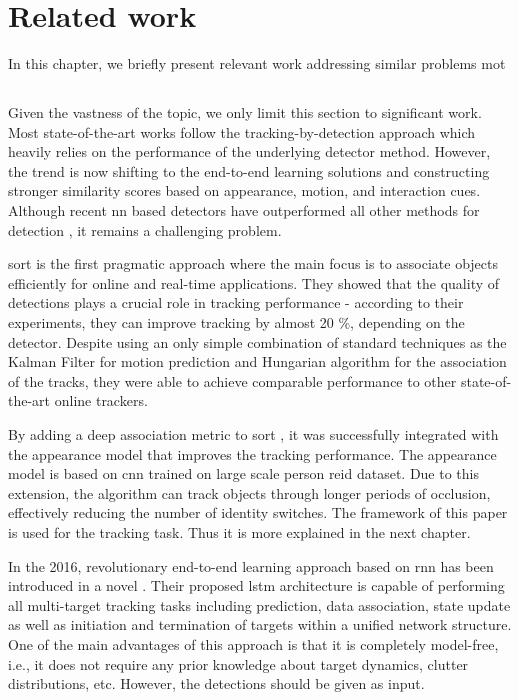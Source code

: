 \chapter{Related work}
In this chapter, we briefly present relevant work addressing similar problems \gls{mot}

\section{}
    Given the vastness of the topic, we only limit this section to significant work. Most state-of-the-art works follow the tracking-by-detection approach which heavily relies on the performance of the underlying detector method. However, the trend is now shifting to the end-to-end learning solutions and constructing stronger similarity scores based on appearance, motion, and interaction cues. Although recent \gls{nn} based detectors have outperformed all other methods for detection \cite{russakovsky2015imagenet, ren2015faster, redmon2016you}, it remains a challenging problem.
   
    \Gls{sort} \cite{bewley2016simple} is the first pragmatic approach where the main focus is to associate objects efficiently for online and real-time applications. They showed that the quality of detections plays a crucial role in tracking performance - according to their experiments, they can improve tracking by almost 20 \%, depending on the detector. Despite using an only simple combination of standard techniques as the Kalman Filter for motion prediction and Hungarian algorithm for the association of the tracks, they were able to achieve comparable performance to other state-of-the-art online trackers. 
    
    By adding a deep association metric to \gls{sort} \cite{wojke2017simple}, it was successfully integrated with the appearance model that improves the tracking performance. The appearance model is based on \gls{cnn} trained on large scale person \gls{reid} dataset. Due to this extension, the algorithm can track objects through longer periods of occlusion, effectively reducing the number of identity switches. The framework of this paper is used for the tracking task. Thus it is more explained in the next chapter. 

    In the 2016, revolutionary end-to-end learning approach based on \gls{rnn} has been introduced in a novel \cite{milan2017online}. Their proposed \gls{lstm} architecture is capable of performing all multi-target tracking tasks including prediction, data association, state update as well as initiation and termination of targets within a unified network structure. One of the main advantages of this approach is that it is completely model-free, i.e., it does not require any prior knowledge about target dynamics, clutter distributions, etc. However, the detections should be given as input.
    
